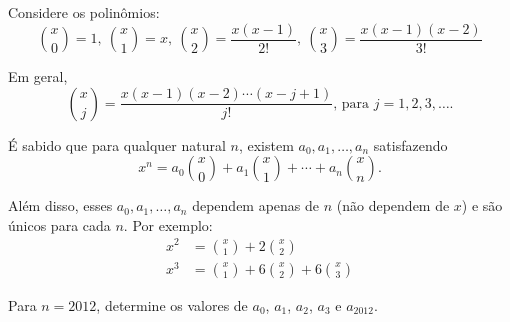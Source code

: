 Considere os polinômios: \[ \binom{x}{0} = 1,\
							\binom{x}{1} = x,\ 
							\binom{x}{2} = \frac{x(x-1)}{2!},\ 
							\binom{x}{3} = \frac{x(x-1)(x-2)}{3!}\]

Em geral, \[\binom{x}{j} = \frac{x(x-1)(x-2)\cdots(x-j+1)}{j!}\text{, para $j = 1, 2, 3, \dots$.}\]

É sabido que para qualquer natural $n$, existem $a_0, a_1, \dots, a_n$ satisfazendo \[x^n = a_0 \binom{x}{0} + a_1 \binom{x}{1} + \cdots + a_n\binom{x}{n}.\]

Além disso, esses $a_0, a_1, \dots, a_n$ dependem apenas de $n$ (não dependem de $x$) e são únicos para cada $n$. Por exemplo:
\begin{align*}
	x^2 & = \binom{x}{1} + 2\binom{x}{2}\\
	x^3 & = \binom{x}{1} + 6\binom{x}{2} + 6\binom{x}{3} 
\end{align*}

Para $n = 2012$, determine os valores de $a_0$, $a_1$, $a_2$, $a_3$ e $a_{2012}$.
